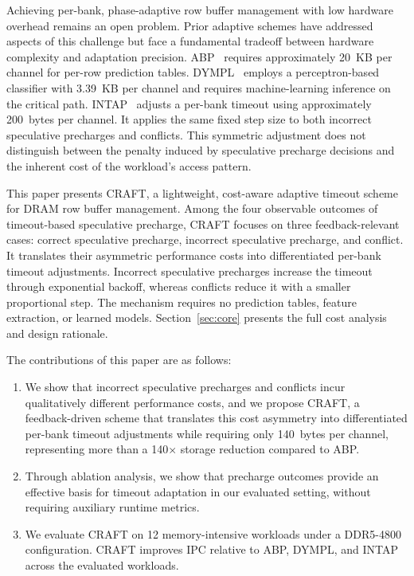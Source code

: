 \documentclass[runningheads]{llncs}
\begin{document}
Achieving per-bank, phase-adaptive row buffer management with low hardware overhead remains an open problem. Prior adaptive schemes have addressed aspects of this challenge but face a fundamental tradeoff between hardware complexity and adaptation precision.
ABP~\cite{Awasthi11} requires approximately 20~KB per channel for per-row prediction tables. DYMPL~\cite{Rafique22} employs a perceptron-based classifier with 3.39~KB per channel and requires machine-learning inference on the critical path. INTAP~\cite{Intel06} adjusts a per-bank timeout using approximately 200~bytes per channel. It applies the same fixed step size to both incorrect speculative precharges and conflicts. This symmetric adjustment does not distinguish between the penalty induced by speculative precharge decisions and the inherent cost of the workload's access pattern.

This paper presents CRAFT, a lightweight, cost-aware adaptive timeout scheme for DRAM row buffer management. Among the four observable outcomes of timeout-based speculative precharge, CRAFT focuses on three feedback-relevant cases: correct speculative precharge, incorrect speculative precharge, and conflict. It translates their asymmetric performance costs into differentiated per-bank timeout adjustments. Incorrect speculative precharges increase the timeout through exponential backoff, whereas conflicts reduce it with a smaller proportional step. The mechanism requires no prediction tables, feature extraction, or learned models. Section~\ref{sec:core} presents the full cost analysis and design rationale.

The contributions of this paper are as follows:

\begin{enumerate}
\item We show that incorrect speculative precharges and conflicts incur qualitatively different performance costs, and we propose CRAFT, a feedback-driven scheme that translates this cost asymmetry into differentiated per-bank timeout adjustments while requiring only 140~bytes per channel, representing more than a 140$\times$ storage reduction compared to ABP.
\item Through ablation analysis, we show that precharge outcomes provide an effective basis for timeout adaptation in our evaluated setting, without requiring auxiliary runtime metrics.
\item We evaluate CRAFT on 12 memory-intensive workloads under a DDR5-4800 configuration. CRAFT improves IPC relative to ABP, DYMPL, and INTAP across the evaluated workloads.
\end{enumerate}
\end{document}

